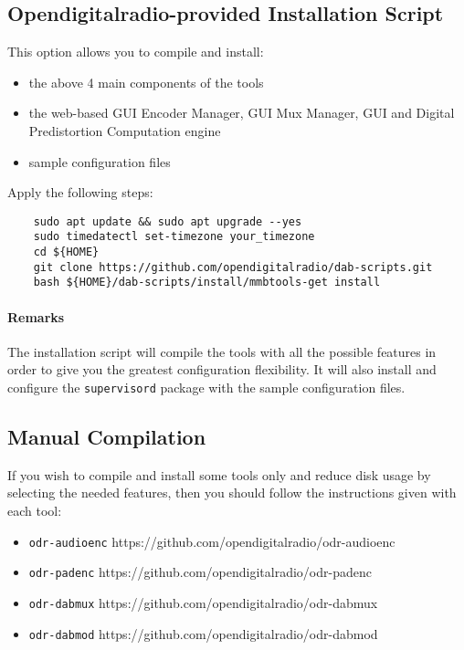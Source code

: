 \subsection{Opendigitalradio-provided Installation Script}
This option allows you to compile and install:
\begin{itemize}
    \item the above 4 main components of the tools

    \item the web-based GUI Encoder Manager, GUI Mux Manager, GUI and Digital
        Predistortion Computation engine
    \item sample configuration files
\end{itemize}

Apply the following steps:
\begin{lstlisting}
    sudo apt update && sudo apt upgrade --yes
    sudo timedatectl set-timezone your_timezone
    cd ${HOME}
    git clone https://github.com/opendigitalradio/dab-scripts.git
    bash ${HOME}/dab-scripts/install/mmbtools-get install
\end{lstlisting}

\paragraph{Remarks}
The installation script will compile the tools with all the possible features
in order to give you the greatest configuration flexibility. It will also
install and configure the \texttt{supervisord} package with the sample configuration files.

\subsection{Manual Compilation}
If you wish to compile and install some tools only and reduce disk usage by
selecting the needed features, then you should follow the instructions given
with each tool:

\begin{itemize}
    \item \texttt{odr-audioenc} https://github.com/opendigitalradio/odr-audioenc
    \item \texttt{odr-padenc} https://github.com/opendigitalradio/odr-padenc
    \item \texttt{odr-dabmux} https://github.com/opendigitalradio/odr-dabmux
    \item \texttt{odr-dabmod} https://github.com/opendigitalradio/odr-dabmod
\end{itemize}

